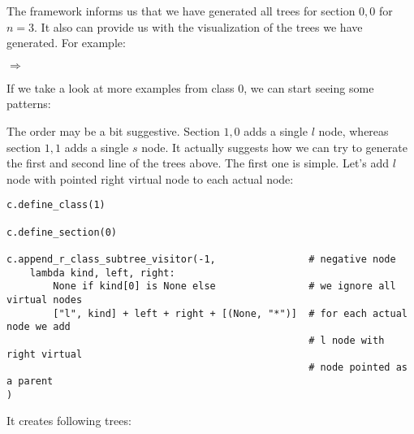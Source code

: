 \documentclass[final]{article}
\theoremstyle{definition}
\theoremstyle{remark}
\newcommand{\includeinlinesvg}[2]{\begin{minipage}{#1\textwidth}\end{minipage}}
\begin{document}
The framework informs us that we have generated all trees for section \(0,0\) for \(n = 3\). It also can provide us with the visualization of the trees we have generated. For example:

\includeinlinesvg{.19}{lambda__trees_00__4_base}%
\(\Rightarrow\)
\includeinlinesvg{.19}{lambda__trees_00__4}%
\includeinlinesvg{.19}{lambda__trees_00__5}%
\includeinlinesvg{.19}{lambda__trees_00__6}%
\includeinlinesvg{.19}{lambda__trees_00__7}%

If we take a look at more examples from class \(0\), we can start seeing some patterns:

\includeinlinesvg{.33}{lambda__trees_00__2}%
\includeinlinesvg{.33}{lambda__trees_00__3}%
\includeinlinesvg{.33}{lambda__trees_00__7}%

\includeinlinesvg{.33}{lambda__trees_00__4}%
\includeinlinesvg{.33}{lambda__trees_00__12}%
\includeinlinesvg{.33}{lambda__trees_00__13}%

\includeinlinesvg{.16}{lambda__trees_00__0}%
\includeinlinesvg{.16}{lambda__trees_00__1}%
\includeinlinesvg{.16}{lambda__trees_00__5}%
\includeinlinesvg{.16}{lambda__trees_00__6}%
\includeinlinesvg{.16}{lambda__trees_00__14}%
\includeinlinesvg{.16}{lambda__trees_00__15}%

\includeinlinesvg{.25}{lambda__trees_00__8}%
\includeinlinesvg{.25}{lambda__trees_00__9}%
\includeinlinesvg{.25}{lambda__trees_00__10}%
\includeinlinesvg{.25}{lambda__trees_00__11}%

The order may be a bit suggestive. Section \(1,0\) adds a single \(l\) node, whereas section \(1,1\) adds a single \(s\) node. It actually suggests how we can try to generate the first and second line of the trees above. The first one is simple. Let's add \(l\) node with pointed right virtual node to each actual node:

\begin{lstlisting}
c.define_class(1)

c.define_section(0)

c.append_r_class_subtree_visitor(-1,                # negative node
    lambda kind, left, right:
        None if kind[0] is None else                # we ignore all virtual nodes
        ["l", kind] + left + right + [(None, "*")]  # for each actual node we add
                                                    # l node with right virtual
                                                    # node pointed as a parent
)
\end{lstlisting}

It creates following trees:
\end{document}
